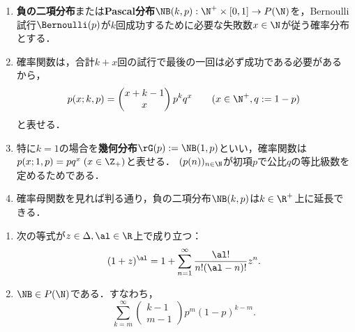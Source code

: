 \documentclass[uplatex,dvipdfmx]{jsreport}
\begin{document}
\begin{definition}\mbox{}
    \begin{enumerate}
        \item \textbf{負の二項分布}または\textbf{Pascal分布}$\NB(k,p):\N^+\times[0,1]\to P(\N)$を，Bernoulli試行$\Bernoulli(p)$が$k$回成功するために必要な失敗数$x\in\N$が従う確率分布とする．
        \item 確率関数は，合計$k+x$回の試行で最後の一回は必ず成功である必要があるから，
        \[p(x;k,p)=\begin{pmatrix}x+k-1\\x\end{pmatrix}p^kq^x\qquad(x\in\N^+,q:=1-p)\]と表せる．
        \item 特に$k=1$の場合を\textbf{幾何分布}$\rG(p):=\NB(1,p)$といい，確率関数は$p(x;1,p)=pq^x\;(x\in\Z_+)$と表せる．
        $(p(n))_{n\in\N}$が初項$p$で公比$q$の等比級数を定めるためである．
        \item 確率母関数を見れば判る通り，負の二項分布$\NB(k,p)$は$k\in\R^+$上に延長できる．
    \end{enumerate}
\end{definition}

\begin{lemma}\mbox{}
    \begin{enumerate}
        \item 次の等式が$z\in\Delta,\al\in\R$上で成り立つ：
        \[(1+z)^\al=1+\sum_{n=1}^\infty\frac{\al!}{n!(\al-n)!}z^n.\]
        \item $\NB\in P(\N)$である．すなわち，
        \[\sum_{k=m}^\infty \begin{pmatrix}k-1\\m-1\end{pmatrix}p^m(1-p)^{k-m}.\]
    \end{enumerate}
\end{lemma}
\end{document}

